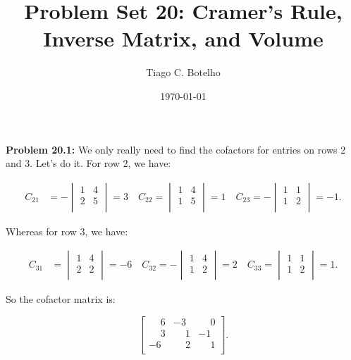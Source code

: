\documentclass{article}
\title{Problem Set 20: Cramer's Rule, Inverse Matrix, and Volume}
\author{Tiago C. Botelho}
\date{\today}
\begin{document}
\maketitle

\noindent \textbf{Problem 20.1:} We only really need to find the cofactors for entries on rows 2 and 3. Let's do it. For row 2, we have:

\begin{align*}
    C_{21} &= -\begin{vmatrix}
    1 & 4\\
    2 & 5\\
    \end{vmatrix}
    = 3 \quad
    C_{22} = \begin{vmatrix}
    1 & 4\\
    1 & 5\\
    \end{vmatrix}
    = 1 \quad
    C_{23} = -\begin{vmatrix}
    1 & 1\\
    1 & 2\\
    \end{vmatrix}
    = -1.
\end{align*}

Whereas for row 3, we have:

\begin{align*}
    C_{31} &= \begin{vmatrix}
    1 & 4\\
    2 & 2\\
    \end{vmatrix}
    = -6 \quad
    C_{32} = -\begin{vmatrix}
    1 & 4\\
    1 & 2\\
    \end{vmatrix}
    = 2 \quad
    C_{33} = \begin{vmatrix}
    1 & 1\\
    1 & 2\\
    \end{vmatrix}
    = 1.
\end{align*}

So the cofactor matrix is:

\[
\begin{bmatrix}
\phantom{-}6 & -3 & \phantom{-}0\\
\phantom{-}3 & \phantom{-}1 & -1\\
-6 & \phantom{-}2 & \phantom{-}1\\
\end{bmatrix}.
\]
\end{document}
